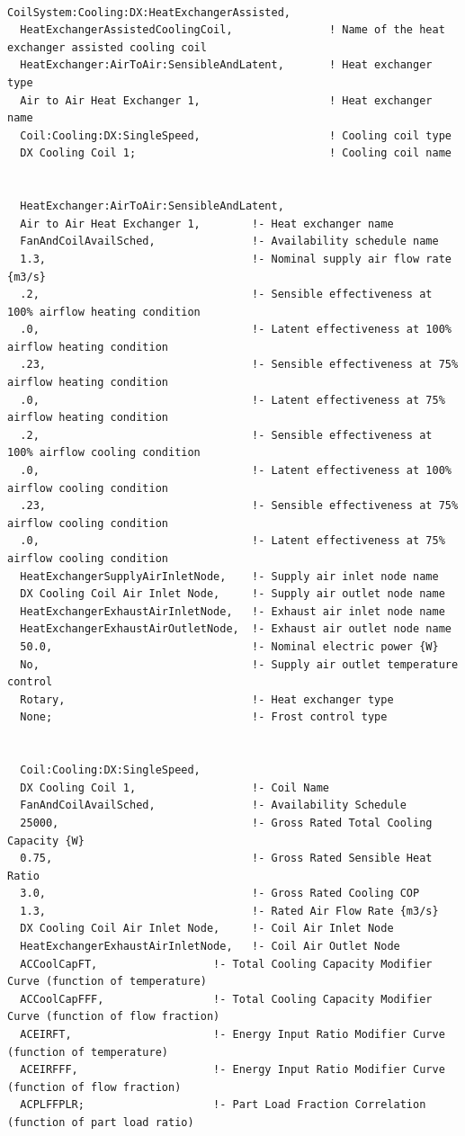 \begin{lstlisting}

CoilSystem:Cooling:DX:HeatExchangerAssisted,
  HeatExchangerAssistedCoolingCoil,               ! Name of the heat exchanger assisted cooling coil
  HeatExchanger:AirToAir:SensibleAndLatent,       ! Heat exchanger type
  Air to Air Heat Exchanger 1,                    ! Heat exchanger name
  Coil:Cooling:DX:SingleSpeed,                    ! Cooling coil type
  DX Cooling Coil 1;                              ! Cooling coil name


  HeatExchanger:AirToAir:SensibleAndLatent,
  Air to Air Heat Exchanger 1,        !- Heat exchanger name
  FanAndCoilAvailSched,               !- Availability schedule name
  1.3,                                !- Nominal supply air flow rate {m3/s}
  .2,                                 !- Sensible effectiveness at 100% airflow heating condition
  .0,                                 !- Latent effectiveness at 100% airflow heating condition
  .23,                                !- Sensible effectiveness at 75% airflow heating condition
  .0,                                 !- Latent effectiveness at 75% airflow heating condition
  .2,                                 !- Sensible effectiveness at 100% airflow cooling condition
  .0,                                 !- Latent effectiveness at 100% airflow cooling condition
  .23,                                !- Sensible effectiveness at 75% airflow cooling condition
  .0,                                 !- Latent effectiveness at 75% airflow cooling condition
  HeatExchangerSupplyAirInletNode,    !- Supply air inlet node name
  DX Cooling Coil Air Inlet Node,     !- Supply air outlet node name
  HeatExchangerExhaustAirInletNode,   !- Exhaust air inlet node name
  HeatExchangerExhaustAirOutletNode,  !- Exhaust air outlet node name
  50.0,                               !- Nominal electric power {W}
  No,                                 !- Supply air outlet temperature control
  Rotary,                             !- Heat exchanger type
  None;                               !- Frost control type


  Coil:Cooling:DX:SingleSpeed,
  DX Cooling Coil 1,                  !- Coil Name
  FanAndCoilAvailSched,               !- Availability Schedule
  25000,                              !- Gross Rated Total Cooling Capacity {W}
  0.75,                               !- Gross Rated Sensible Heat Ratio
  3.0,                                !- Gross Rated Cooling COP
  1.3,                                !- Rated Air Flow Rate {m3/s}
  DX Cooling Coil Air Inlet Node,     !- Coil Air Inlet Node
  HeatExchangerExhaustAirInletNode,   !- Coil Air Outlet Node
  ACCoolCapFT,                  !- Total Cooling Capacity Modifier Curve (function of temperature)
  ACCoolCapFFF,                 !- Total Cooling Capacity Modifier Curve (function of flow fraction)
  ACEIRFT,                      !- Energy Input Ratio Modifier Curve (function of temperature)
  ACEIRFFF,                     !- Energy Input Ratio Modifier Curve (function of flow fraction)
  ACPLFFPLR;                    !- Part Load Fraction Correlation (function of part load ratio)
\end{lstlisting}


